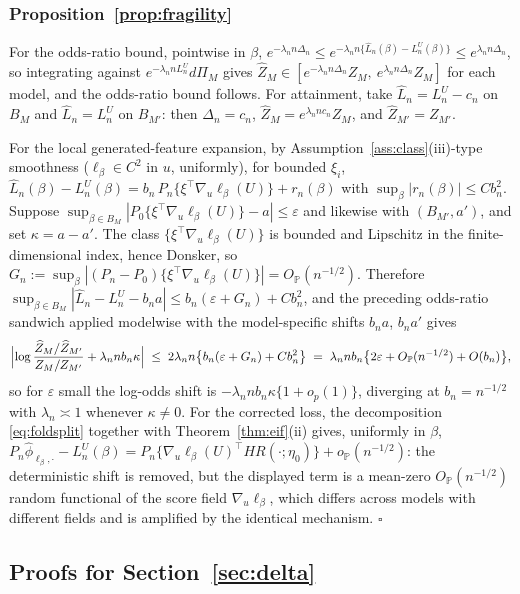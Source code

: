 \documentclass[11pt]{article}
\newcommand{\Pp}{\mathbb P}
\newcommand{\opro}{o_{\Pp}}
\newcommand{\Op}{O_{\Pp}}
\newcommand{\hphi}{\widehat\phi}
\newcommand{\eps}{\varepsilon}
\begin{document}
\subsubsection{Proposition~\ref{prop:fragility}}
For the odds-ratio bound, pointwise in $\beta$, $e^{-\lambda_nn\Delta_n}\le e^{-\lambda_nn\{\widehat L_n(\beta)-L_n^U(\beta)\}}\le e^{\lambda_nn\Delta_n}$, so integrating against $e^{-\lambda_nnL_n^U}d\Pi_M$ gives $\widehat Z_M\in[e^{-\lambda_nn\Delta_n}Z_M,\ e^{\lambda_nn\Delta_n}Z_M]$ for each model, and the odds-ratio bound follows. For attainment, take $\widehat L_n=L^U_n-c_n$ on $B_M$ and $\widehat L_n=L^U_n$ on $B_{M'}$: then $\Delta_n=c_n$, $\widehat Z_M=e^{\lambda_nnc_n}Z_M$, and $\widehat Z_{M'}=Z_{M'}$.

For the local generated-feature expansion, by Assumption~\ref{ass:class}(iii)-type smoothness ($\ell_\beta\in C^2$ in $u$, uniformly), for bounded $\xi_i$,
$\widehat L_n(\beta)-L^U_n(\beta)=b_n\,P_n\{\xi^\top\nabla_u\ell_\beta(U)\}+r_n(\beta)$ with $\sup_\beta|r_n(\beta)|\le Cb_n^2$. Suppose $\sup_{\beta\in B_M}|P_0\{\xi^\top\nabla_u\ell_\beta(U)\}-a|\le\eps$ and likewise with $(B_{M'},a')$, and set $\kappa=a-a'$. The class $\{\xi^\top\nabla_u\ell_\beta(U)\}$ is bounded and Lipschitz in the finite-dimensional index, hence Donsker, so $G_n:=\sup_\beta|(P_n-P_0)\{\xi^\top\nabla_u\ell_\beta(U)\}|=\Op(n^{-1/2})$. Therefore $\sup_{\beta\in B_M}|\widehat L_n-L^U_n-b_na|\le b_n(\eps+G_n)+Cb_n^2$, and the preceding odds-ratio sandwich applied modelwise with the model-specific shifts $b_na$, $b_na'$ gives
\begin{equation*}
\Bigl|\log\frac{\widehat Z_M/\widehat Z_{M'}}{Z_M/Z_{M'}}+\lambda_nnb_n\kappa\Bigr|
\;\le\;2\lambda_nn\bigl\{b_n(\eps+G_n)+Cb_n^2\bigr\}
\;=\;\lambda_nnb_n\bigl\{2\eps+\Op(n^{-1/2})+O(b_n)\bigr\},
\end{equation*}
so for $\eps$ small the log-odds shift is $-\lambda_nnb_n\kappa\{1+o_p(1)\}$, diverging at $b_n=n^{-1/2}$ with $\lambda_n\asymp1$ whenever $\kappa\ne0$. For the corrected loss, the decomposition \eqref{eq:foldsplit} together with Theorem~\ref{thm:eif}(ii) gives, uniformly in $\beta$,
$P_n\hphi_{\ell_\beta,\cdot}-L^U_n(\beta)=P_n\{\nabla_u\ell_\beta(U)^\top HR(\cdot;\eta_0)\}+\opro(n^{-1/2})$:
the deterministic shift is removed, but the displayed term is a mean-zero $\Op(n^{-1/2})$ random functional of the score field $\nabla_u\ell_\beta$, which differs across models with different fields and is amplified by the identical mechanism. \hfill$\square$

\subsection{Proofs for Section~\ref{sec:delta}}\label{app:delta}
\end{document}
